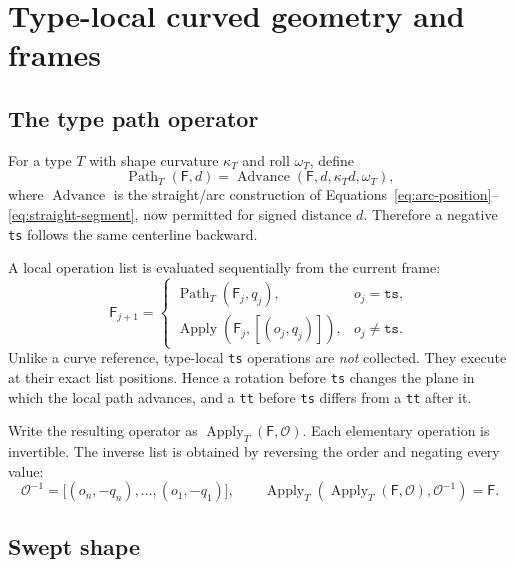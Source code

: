 \documentclass[11pt,a4paper]{article}
\newcommand{\Frame}{\mathsf{F}}
\newcommand{\Apply}{\operatorname{Apply}}
\newcommand{\Path}{\operatorname{Path}}
\newcommand{\ops}{\mathcal{O}}
\begin{document}
\section{Type-local curved geometry and frames}
\label{sec:type-local}

\subsection{The type path operator}

For a type $T$ with shape curvature $\kappa_T$ and roll $\omega_T$, define
\begin{equation}
  \Path_T(\Frame,d)
  =\operatorname{Advance}(\Frame,d,\kappa_T d,\omega_T),
  \label{eq:type-path}
\end{equation}
where \(\operatorname{Advance}\) is the straight/arc construction of
Equations~\eqref{eq:arc-position}--\eqref{eq:straight-segment}, now permitted
for signed distance $d$.  Therefore a negative \texttt{ts} follows the same
centerline backward.

A local operation list is evaluated sequentially from the current frame:
\begin{equation}
 \Frame_{j+1}=
 \begin{cases}
   \Path_T(\Frame_j,q_j), & o_j=\texttt{ts},\\
   \Apply(\Frame_j,[(o_j,q_j)]), & o_j\ne\texttt{ts}.
 \end{cases}
 \label{eq:type-operation-recursion}
\end{equation}
Unlike a curve reference, type-local \texttt{ts} operations are \emph{not}
collected.  They execute at their exact list positions.  Hence a rotation
before \texttt{ts} changes the plane in which the local path advances, and a
\texttt{tt} before \texttt{ts} differs from a \texttt{tt} after it.

Write the resulting operator as $\Apply_T(\Frame,\ops)$.  Each elementary
operation is invertible.  The inverse list is obtained by reversing the order
and negating every value:
\begin{equation}
  \ops^{-1}=\big[(o_n,-q_n),\ldots,(o_1,-q_1)\big],
  \qquad
  \Apply_T(\Apply_T(\Frame,\ops),\ops^{-1})=\Frame.
  \label{eq:inverse-operations}
\end{equation}

\subsection{Swept shape}
\end{document}
